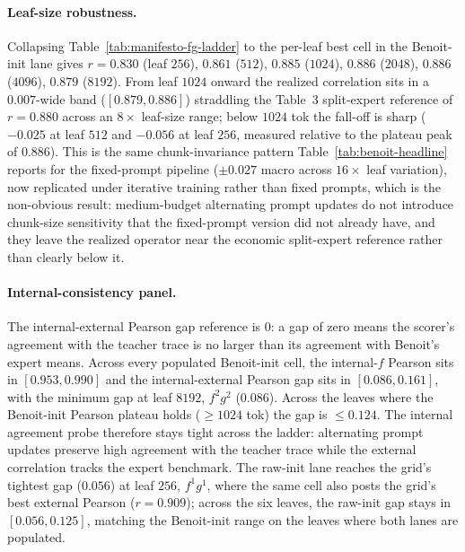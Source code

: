 \paragraph{Leaf-size robustness.} Collapsing
Table~\ref{tab:manifesto-fg-ladder} to the per-leaf best cell in the
Benoit-init lane gives $r = 0.830$ (leaf $256$), $0.861$ ($512$),
$0.885$ ($1024$), $0.886$ ($2048$), $0.886$ ($4096$), $0.879$ ($8192$).
From leaf $1024$ onward the realized correlation sits in a $0.007$-wide
band ($[0.879, 0.886]$) straddling the \citet{BenoitEtAl2025} Table~3
split-expert reference of $r = 0.880$ across an $8\times$ leaf-size
range; below $1024$ tok the fall-off is sharp ($-0.025$ at leaf $512$
and $-0.056$ at leaf $256$, measured relative to the plateau peak of
$0.886$). This is the same chunk-invariance
pattern Table~\ref{tab:benoit-headline} reports for the fixed-prompt
pipeline ($\pm 0.027$ macro across $16\times$ leaf variation), now
replicated under iterative training rather than fixed prompts, which
is the non-obvious result: medium-budget alternating prompt updates do not
introduce chunk-size sensitivity that the fixed-prompt version did
not already have, and they leave the realized operator near the
economic split-expert reference rather than clearly below it.

\paragraph{Internal-consistency panel.} The internal-external Pearson
gap reference is $0$: a gap of zero means the scorer's agreement with
the teacher trace is no larger than its agreement with Benoit's expert
means. Across every populated Benoit-init cell, the internal-$f$ Pearson
sits in $[0.953, 0.990]$ and the internal-external Pearson gap sits in
$[0.086, 0.161]$, with the minimum gap at leaf $8192$, $f^2 g^2$
($0.086$). Across the leaves where the Benoit-init Pearson plateau holds
($\geq 1024$ tok) the gap is $\leq 0.124$. The internal agreement
probe therefore stays tight across the ladder: alternating prompt
updates preserve high agreement with the teacher trace while the
external correlation tracks the expert benchmark. The raw-init lane
reaches the grid's tightest gap ($0.056$) at leaf $256$, $f^1 g^1$,
where the same cell also posts the grid's best external Pearson
($r = 0.909$); across the six leaves, the raw-init gap stays in
$[0.056, 0.125]$, matching the Benoit-init range on the leaves where
both lanes are populated.

